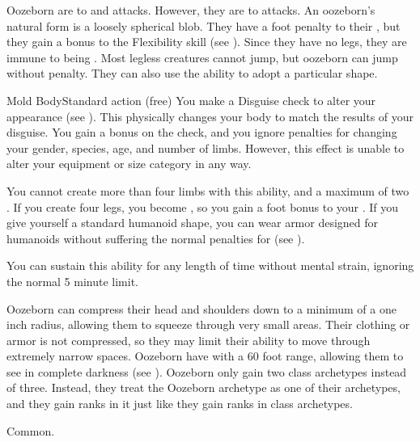   \begin{raggeditemize}
     Oozeborn are \resistant to \atAcid and \atPoison attacks. However, they are \vulnerable to \atEarth attacks.
     An oozeborn's natural form is a loosely spherical blob.
      They have a  foot penalty to their , but they gain a  bonus to the Flexibility skill (see ).
      Since they have no legs, they are immune to being \prone.
      Most legless creatures cannot jump, but oozeborn can jump without penalty.
      They can also use the  ability to adopt a particular shape.
      \begin{sustainability}{Mold Body}{Standard action}
        \abilitytags {} (free)
        \rankline
        You make a Disguise check to alter your appearance (see ).
        This physically changes your body to match the results of your disguise.
        You gain a  bonus on the check, and you ignore penalties for changing your gender, species, age, and number of limbs.
        However, this effect is unable to alter your equipment or size category in any way.

        You cannot create more than four limbs with this ability, and a maximum of two .
        If you create four legs, you become , so you gain a  foot bonus to your .
        If you give yourself a standard humanoid shape, you can wear armor designed for humanoids without suffering the normal penalties for  (see ).

        You can sustain this ability for any length of time without mental strain, ignoring the normal 5 minute limit.
      \end{sustainability}
     Oozeborn can compress their head and shoulders down to a minimum of a one inch radius, allowing them to squeeze through very small areas.
      Their clothing or armor is not compressed, so they may limit their ability to move through extremely narrow spaces.
     Oozeborn have  with a 60 foot range, allowing them to see in complete darkness (see ).
     Oozeborn only gain two class archetypes instead of three.
      Instead, they treat the Oozeborn archetype as one of their archetypes, and they gain ranks in it just like they gain ranks in class archetypes.
  \end{raggeditemize}
   Common.

